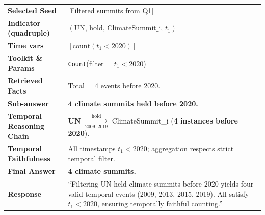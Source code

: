 \begin{table}[t]
\begin{tabularx}{0.97\textwidth}{@{}p{4.3cm}X@{}}
\textbf{Selected Seed} & [Filtered summits from Q1] \\
\textbf{Indicator (quadruple)} & $(\text{UN},\,\text{hold},\,\text{ClimateSummit\_i},\,t_1)$ \\
\textbf{Time vars} & $[\text{count}(t_1<2020)]$ \\
\textbf{Toolkit \& Params} & \texttt{Count}(filter = $t_1<2020$) \\
\textbf{Retrieved Facts} & Total = 4 events before 2020. \\
\textbf{Sub-answer} & \textbf{4 climate summits held before 2020.} \\
\toprule
\textbf{Temporal Reasoning Chain} &
\textbf{UN} $\xrightarrow[\text{2009–2019}]{\text{hold}}$ ClimateSummit\_i (\textbf{4 instances before 2020}). \\
\textbf{Temporal Faithfulness} & All timestamps $t_1<2020$; aggregation respects strict temporal filter. \\
\textbf{Final Answer} & \textbf{4 climate summits.} \\
\textbf{Response} &
“Filtering UN-held climate summits before 2020 yields four valid temporal events (2009, 2013, 2015, 2019).  
All satisfy $t_1<2020$, ensuring temporally faithful counting.” \\
\bottomrule
\end{tabularx}
\end{table}
\newpage


